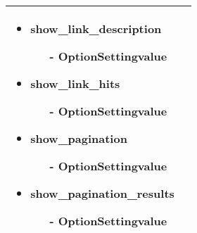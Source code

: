 \begin{minipage}{0.7\textwidth}
\begin{tabular}{|p{} | p{}|}
\begin{itemize}
\begin{enumerate}
  \end{enumerate} 
\item show\_link\_description
\begin{enumerate}
    \item[-] OptionSettingvalue
  \end{enumerate} 
\item show\_link\_hits
\begin{enumerate}
    \item[-] OptionSettingvalue
  \end{enumerate} 
\item show\_pagination
\begin{enumerate}
    \item[-] OptionSettingvalue
  \end{enumerate} 
\item show\_pagination\_results
\begin{enumerate}
    \item[-] OptionSettingvalue
  \end{enumerate} 
\end{itemize}
\\
\hline
\end{tabular}
\end{minipage}

